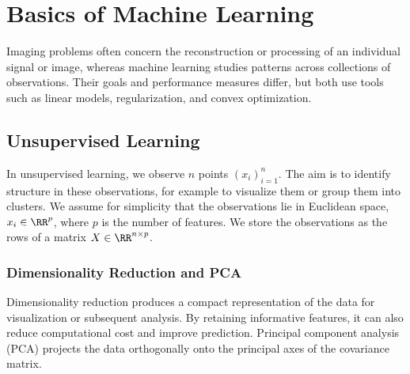
\chapter{Basics of Machine Learning}



Imaging problems often concern the reconstruction or processing of an individual signal or image, whereas machine learning studies patterns across collections of observations. Their goals and performance measures differ, but both use tools such as linear models, regularization, and convex optimization.


\section{Unsupervised Learning}

In unsupervised learning, we observe $n$ points $(x_i)_{i=1}^n$.
%
The aim is to identify structure in these observations, for example to visualize them or group them into clusters.
%
We assume for simplicity that the observations lie in Euclidean space, $x_i \in \RR^p$, where $p$ is the number of features. We store the observations as the rows of a matrix $X\in\RR^{n\times p}$.


\subsection{Dimensionality Reduction and PCA}

Dimensionality reduction produces a compact representation of the data for visualization or subsequent analysis. By retaining informative features, it can also reduce computational cost and improve prediction.
%
Principal component analysis (PCA) projects the data orthogonally onto the principal axes of the covariance matrix.

